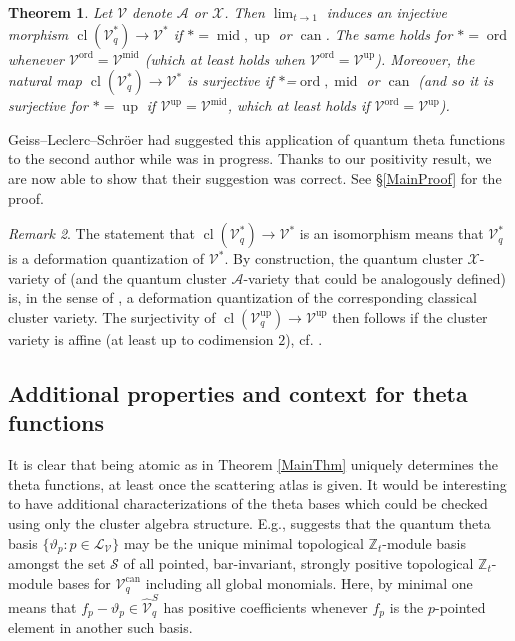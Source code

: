 \documentclass{amsart}
\DeclareMathOperator{\cl}{cl}
\DeclareMathOperator{\up}{up}
\DeclareMathOperator{\midd}{mid}
\DeclareMathOperator{\ord}{ord}
\DeclareMathOperator{\can}{can}
\let\bb=\mathbb
\let\rar=\rightarrow
\let\s=\mathcal
\let\wh=\widehat
\theoremstyle{plain}%
\newtheorem{thm}{Theorem}[section]
\newcommand{\Z}{{\mathbb Z}}
\theoremstyle{definition}
\theoremstyle{remark}
\newtheorem{rmk}[thm]{Remark}
\begin{document}
\begin{thm}\label{flat}
Let $\s{V}$ denote $\s{A}$ or $\s{X}$.  Then $\lim_{t\rar 1}$ induces an injective morphism $\cl(\s{V}_q^*)\rightarrow \s{V}^*$ if $*=\midd, \up$ or $\can$.  The same holds for $*=\ord$ whenever $\s{V}^{\ord}=\s{V}^{\midd}$ (which at least holds when $\s{V}^{\ord}=\s{V}^{\up}$).  Moreover, the natural map $\cl(\s{V}_q^*)\rightarrow \s{V}^*$ is surjective if $*$=$\ord,\midd$ or $\can$ (and so it is surjective for $*=\up$ if $\s{V}^{\up}=\s{V}^{\midd}$, which at least holds if $\s{V}^{\ord}=\s{V}^{\up}$).
\end{thm}



Geiss--Leclerc--Schr{\"o}er had suggested this application of quantum theta functions to the second author while \cite{GLSflat} was in progress. 
Thanks to our positivity result, we are now able to show that their suggestion was correct. 
See \S \ref{MainProof} for the proof.  


\begin{rmk}
The statement that $\cl(\s{V}_q^*)\rar \s{V}^*$ is an isomorphism means that $\s{V}_q^*$ is a deformation quantization of $\s{V}^*$.  By construction, the quantum cluster $\s{X}$-variety of \cite[\S 3]{FG1} (and the quantum cluster $\s{A}$-variety that could be analogously defined) is, in the sense of \cite[Def. 5]{Bou3}, a deformation quantization of the corresponding classical cluster variety.  The surjectivity of $\cl(\s{V}_q^{\up})\rar \s{V}^{\up}$ then follows if the cluster variety is affine (at least up to codimension $2$), cf. \cite[Lem. 7]{Bou3}.
\end{rmk}


\subsection{Additional properties and context for theta functions}\label{PosIntro}
It is clear that being atomic as in  Theorem \ref{MainThm} uniquely determines the theta functions, at least once the scattering atlas is given.  It would be interesting to have additional characterizations of the theta bases which could be checked using only the cluster algebra structure.  E.g., \cite[Conj. 14]{LLRZpnas}  suggests that the quantum theta basis $\{\vartheta_p\colon p\in \s{L}_{\s{V}}\}$ may be the unique minimal topological $\bb{Z}_t$-module basis amongst the set $\s{S}$ of all pointed, bar-invariant, strongly positive topological $\Z_t$-module bases for $\s{V}_q^{\can}$ including all global monomials.  Here, by minimal one means that $f_p-\vartheta_p\in \wh{\s{V}}_q^S$ has positive coefficients whenever $f_p$ is the $p$-pointed element in another such basis. 
\end{document}
